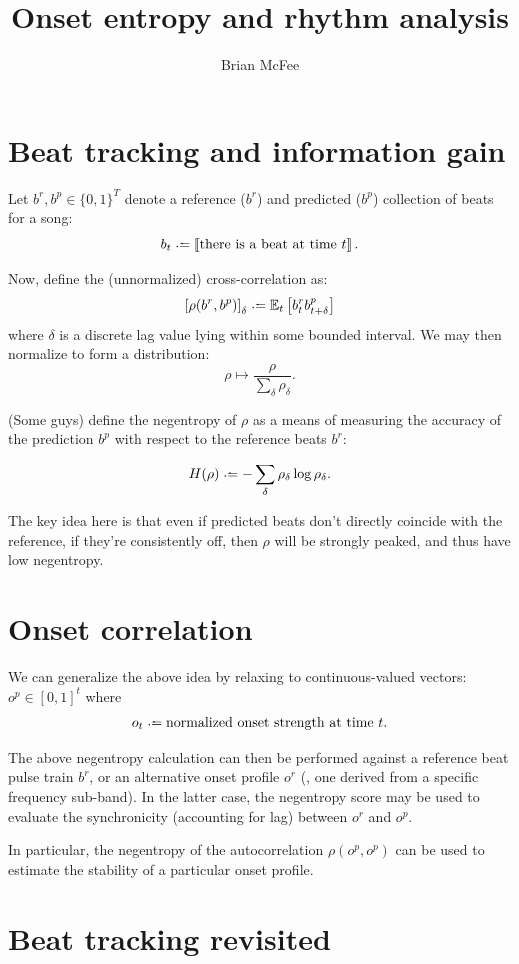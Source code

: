 \documentclass{article}
\title{Onset entropy and rhythm analysis}
\author{Brian McFee}
\begin{document}
\maketitle

\section{Beat tracking and information gain}

Let $b^r, b^p \in \{0,1\}^T$ denote a reference ($b^r$) and predicted ($b^p$) collection of beats
for a song: 
    \[
        b_t \defeq \ind{\text{there is a beat at time } t}.
    \]

Now, define the (unnormalized) cross-correlation as:
\[
\left[\rho(b^r, b^p)\right]_\delta \defeq \E_t \left[b^r_t b^p_{t+\delta} \right]
\]
where $\delta$ is a discrete lag value lying within some bounded interval.
We may then normalize to form a distribution:
\[
\rho \mapsto \frac{\rho}{\sum_\delta \rho_\delta}.
\]

(Some guys) define the negentropy of $\rho$ as a means of measuring the accuracy of the prediction $b^p$ with 
respect to the reference beats $b^r$:

\[
H(\rho) \defeq - \sum_\delta \rho_\delta \log \rho_\delta.
\]

The key idea here is that even if predicted beats don't directly coincide with the reference, if they're
consistently off, then $\rho$ will be strongly peaked, and thus have low negentropy.

\section{Onset correlation}
We can generalize the above idea by relaxing to continuous-valued vectors: $o^p \in [0,1]^t$ where 
\[
    o_t \defeq \text{normalized onset strength at time } t.
\]

The above negentropy calculation can then be performed against a reference beat pulse train $b^r$, or an
alternative onset profile $o^r$ (\eg, one derived from a specific frequency sub-band).  
In the latter case, the negentropy score may be used to evaluate the synchronicity (accounting for lag) between
$o^r$ and $o^p$.

In particular, the negentropy of the autocorrelation $\rho(o^p, o^p)$ can be used to estimate
the stability of a particular onset profile.


\section{Beat tracking revisited}
\end{document}
